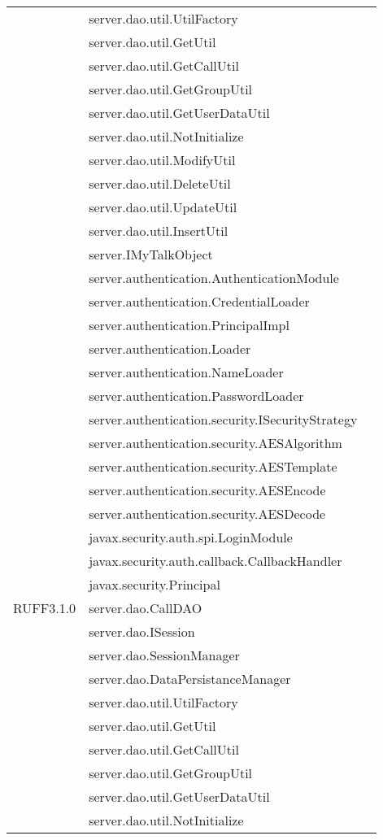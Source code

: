 \begin{center}
\begin{longtable}{lp{}l}
& server.dao.util.UtilFactory\\
& server.dao.util.GetUtil\\
& server.dao.util.GetCallUtil\\
& server.dao.util.GetGroupUtil\\
& server.dao.util.GetUserDataUtil\\
& server.dao.util.NotInitialize\\
& server.dao.util.ModifyUtil\\
& server.dao.util.DeleteUtil\\
& server.dao.util.UpdateUtil\\
& server.dao.util.InsertUtil\\
& server.IMyTalkObject\\
& server.authentication.AuthenticationModule\\
& server.authentication.CredentialLoader\\
& server.authentication.PrincipalImpl\\
& server.authentication.Loader\\
& server.authentication.NameLoader\\
& server.authentication.PasswordLoader\\
& server.authentication.security.ISecurityStrategy\\
& server.authentication.security.AESAlgorithm\\
& server.authentication.security.AESTemplate\\
& server.authentication.security.AESEncode\\
& server.authentication.security.AESDecode\\
& javax.security.auth.spi.LoginModule\\
& javax.security.auth.callback.CallbackHandler\\
& javax.security.Principal\\
RUFF3.1.0 & server.dao.CallDAO\\
& server.dao.ISession\\
& server.dao.SessionManager\\
& server.dao.DataPersistanceManager\\
& server.dao.util.UtilFactory\\
& server.dao.util.GetUtil\\
& server.dao.util.GetCallUtil\\
& server.dao.util.GetGroupUtil\\
& server.dao.util.GetUserDataUtil\\
& server.dao.util.NotInitialize\\

\end{longtable}
\end{center}
